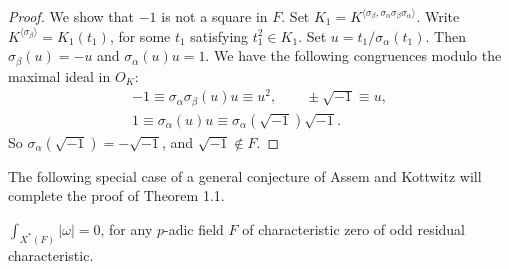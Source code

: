 \documentclass{amsart}
\newenvironment{cthm}[1]
  {\renewcommand\thethm{\bf #1}\thm}
  {\endthm}
\begin{document}
\begin{proof}
We show that $-1$ is not a square in $F$.  Set $K_1 = 
K^{\langle\sigma_\beta,\sigma_\alpha\sigma_\beta\sigma_\alpha\rangle}$.
Write $K^{\langle\sigma_\beta\rangle} =
K_1(t_1)$, for some $t_1$ satisfying $t_1^2\in K_1$.  Set $u=t_1/\sigma_\alpha(t_1)$.
Then $\sigma_\beta(u) = -u$ and $\sigma_\alpha(u) u =1$.  We have the
following congruences modulo the maximal ideal in $O_K$:
\begin{gather*}
-1\equiv \sigma_\alpha\sigma_\beta(u) u \equiv u^2,\qquad
 \pm\sqrt{-1} \equiv u,\\
1\equiv \sigma_\alpha(u) u \equiv \sigma_\alpha(\sqrt{-1}) \sqrt{-1}.
\end{gather*}
So $\sigma_\alpha(\sqrt{-1}) =-\sqrt{-1}$, and $\sqrt{-1}\not\in F$.
\end{proof}

The following special case of  a general conjecture
of Assem and Kottwitz will complete the proof of Theorem 1.1.

\bigskip
\noindent
\begin{cthm}{Theorem 3.3}   $\int_{X^*(F)}|\omega| = 0$, 
for any $p$-adic field $F$
of characteristic zero of odd residual characteristic.
\end{cthm}
\end{document}
